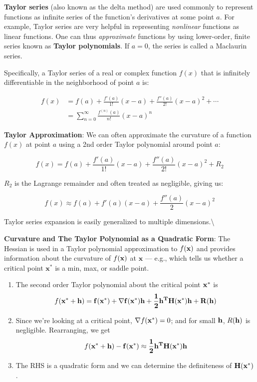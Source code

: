 \documentclass[]{book}
\newcommand{\fx}{f({\bf x})}
\theoremstyle{definition}
\theoremstyle{definition}
\theoremstyle{definition}
\theoremstyle{remark}
\begin{document}
\textbf{Taylor series} (also known as the delta method) are used
commonly to represent functions as infinite series of the function's
derivatives at some point \(a\). For example, Taylor series are very
helpful in representing \emph{nonlinear} functions as linear functions.
One can thus \emph{approximate} functions by using lower-order, finite
series known as \textbf{Taylor polynomials}. If \(a=0\), the series is
called a Maclaurin series.

Specifically, a Taylor series of a real or complex function \(f(x)\)
that is infinitely differentiable in the neighborhood of point \(a\) is:

\begin{align*}
    f(x) &= f(a) + \frac{f'(a)}{1!} (x-a) +  \frac{f''(a)}{2!} (x-a)^2 + \cdots\\
     &= \sum_{n=0}^\infty \frac{f^{(n)} (a)}{n!} (x-a)^n
\end{align*}

\textbf{Taylor Approximation}: We can often approximate the curvature of
a function \(f(x)\) at point \(a\) using a 2nd order Taylor polynomial
around point \(a\):

\[f(x) = f(a) + \frac{f'(a)}{1!} (x-a) +  \frac{f''(a)}{2!} (x-a)^2
+ R_2\]

\(R_2\) is the Lagrange remainder and often treated as negligible,
giving us:

\[f(x) \approx f(a) + f'(a)(x-a) +  \dfrac{f''(a)}{2} (x-a)^2\]

Taylor series expansion is easily generalized to multiple
dimensions.\textbackslash{}

\textbf{Curvature and The Taylor Polynomial as a Quadratic Form}: The
Hessian is used in a Taylor polynomial approximation to \(\fx\) and
provides information about the curvature of \(\fx\) at \(\bm{x}\) ---
e.g., which tells us whether a critical point \(\bm{x}^*\) is a min,
max, or saddle point.

\begin{enumerate}
  \item The second order Taylor polynomial about the critical point
${\bf x}^*$ is
  $$f({\bf x}^*+\bf h)=f({\bf x}^*)+\nabla f({\bf x}^*) \bf h +\frac{1}{2} \bf h^T
{\bf H(x^*)} \bf h + R(\bf h)$$
  \item Since we're looking at a critical point, $\nabla f({\bf x}^*)=0$;
and for small $\bf h$, $R(\bf h)$ is negligible.  Rearranging, we get
$$f({\bf x}^*+\bf h)-f({\bf x}^*)\approx \frac{1}{2} \bf h^T {\bf H(x^*)}
\bf h $$
  \item The RHS is a quadratic form and we can determine the definiteness of $\bf
H(x^*)$.
\end{enumerate}
\end{document}
